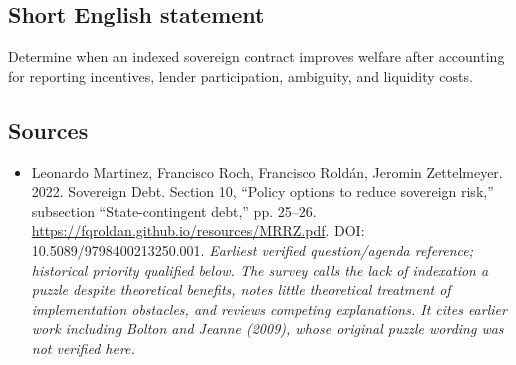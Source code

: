 \documentclass[11pt]{article}
\begin{document}
\subsection{Short English statement}
Determine when an indexed sovereign contract improves welfare after accounting for reporting incentives, lender participation, ambiguity, and liquidity costs.

\subsection{Sources}
\begin{itemize}\raggedright
\item[\textnormal{[S1]}]\hypertarget{source:30007539:1}{} Leonardo Martinez, Francisco Roch, Francisco Roldán, Jeromin Zettelmeyer. 2022. Sovereign Debt. Section 10, “Policy options to reduce sovereign risk,” subsection “State-contingent debt,” pp. 25–26.
\url{https://fqroldan.github.io/resources/MRRZ.pdf}.
DOI: 10.5089/9798400213250.001.
{\small\textit{Earliest verified question/agenda reference; historical priority qualified below. The survey calls the lack of indexation a puzzle despite theoretical benefits, notes little theoretical treatment of implementation obstacles, and reviews competing explanations. It cites earlier work including Bolton and Jeanne (2009), whose original puzzle wording was not verified here.}}
\end{itemize}
\end{document}
